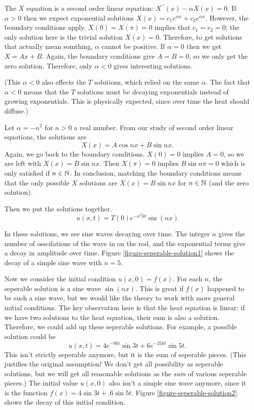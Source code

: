 \documentclass[fleqn,letterpaper]{report}
\begin{document}
The $X$ equation is a second order linear equation: $X^{\prime
\prime}(x) - \alpha X(x) = 0$. If $\alpha > 0$ then we expect
exponential solutions $X(x) = c_1 e^{\alpha x} + c_2e^{\alpha
x}$. However, the boundary conditions apply. $X(0) = X(\pi) =
0$ implies that $c_1 = c_2 = 0$; the only solution here is the
trivial solution $X(x) = 0$.  Therefore, to get solutions that
actually mean somthing, $\alpha$ cannot be positive. If
$\alpha = 0$ then we get $X = Ax + B$. Again, the boundary
conditions give $A=B=0$, so we only get the zero solution.
Therefore, only $\alpha < 0$ gives interesting solutions. 

(This $\alpha < 0$ also effects the $T$ solutions, which relied
on the same $\alpha$. The fact that $\alpha < 0$ means that
the $T$ solutions must be decaying exponentials instead of
growing exponentials. This is physically expected, since over
time the heat should diffuse.)

Let $\alpha = -n^2$ for $n > 0$ a real number. From our study
of second order linear equations, the solutions are
\begin{equation*}
X(x) = A \cos nx + B \sin nx.
\end{equation*}
Again, we go back to the boundary conditions. $X(0) = 0$
implies $A=0$, so we are left with $X(x) = B \sin nx$. Then
$X(\pi) = 0$ implies $B \sin n\pi = 0$ which is only satisfied
if $n \in \mathbb{N}$. In conclusion, matching the boundary
conditions means that the only possible $X$ solutions are
$X(x) = B \sin nx$ for $n \in \mathbb{N}$ (and the zero solution). 

Then we put the solutions together.
\begin{equation*}
u(x,t) = T(0) e^{-n^2kt} \sin (nx) 
\end{equation*}

In these solutions, we see sine waves decaying over time. The
integer $n$ gives the number of osscilations of the wave in
on the rod, and the exponential terms give a decay in
amplitude over time. Figure \ref{figure-seperable-solution1} shows the
decay of a simple sine wave with $n=5$.

Now we consider the initial condition $u(x,0) = f(x)$. For
each $n$, the seperable solution is a sine wave $\sin
(nx)$. This is great if $f(x)$ happened to be such a sine
wave, but we would like the theory to work with more general
initial conditions. The key observation here is that the heat
equation is linear: if we have two solutions to the
heat equation, their sum is also a solution. Therefore, we
could add up these seperable solutions. For example, a
possible solution could be 
\begin{equation*}
u(x,t) = 4e^{-9kt} \sin 3t + 6e^{-25kt} \sin 5t.
\end{equation*}
This isn't strictly seperable anymore, but it is the sum of
seperable pieces. (This justifies the original assumption! We
don't get all possibility as seperable solutions, but we will
get all reasonable solutions as the \emph{sum} of various
seperable pieces.) The initial value $u(x,0)$ also isn't a
simple sine wave anymore, since it is the function $f(x) =
4\sin 3t + .6 \sin 5t$. Figure \ref{figure-seperable-solution2} shows
the decay of this initial condition.
\end{document}
